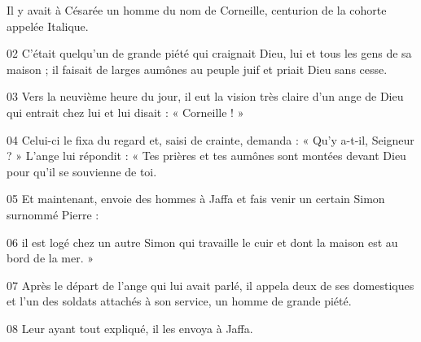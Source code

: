 Il y avait à Césarée un homme du nom de Corneille, centurion de la cohorte appelée Italique.

02 C’était quelqu’un de grande piété qui craignait Dieu, lui et tous les gens de sa maison ; il faisait de larges aumônes au peuple juif et priait Dieu sans cesse.

03 Vers la neuvième heure du jour, il eut la vision très claire d’un ange de Dieu qui entrait chez lui et lui disait : « Corneille ! »

04 Celui-ci le fixa du regard et, saisi de crainte, demanda : « Qu’y a-t-il, Seigneur ? » L’ange lui répondit : « Tes prières et tes aumônes sont montées devant Dieu pour qu’il se souvienne de toi.

05 Et maintenant, envoie des hommes à Jaffa et fais venir un certain Simon surnommé Pierre :

06 il est logé chez un autre Simon qui travaille le cuir et dont la maison est au bord de la mer. »

07 Après le départ de l’ange qui lui avait parlé, il appela deux de ses domestiques et l’un des soldats attachés à son service, un homme de grande piété.

08 Leur ayant tout expliqué, il les envoya à Jaffa.